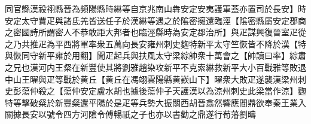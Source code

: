 同官縣漢祋祤縣晉為頻陽縣時綝等自京兆南山犇安定安夷護軍蓋亦置司於長安】時安定太守賈疋與諸氐羌皆送任子於漢綝等遇之於隂密擁還臨涇【隂密縣屬安定郡商之密國詩所謂密人不恭敢距大邦者也臨涇縣時為安定郡治所】與疋謀興復晉室疋從之乃共推疋為平西將軍率衆五萬向長安雍州刺史麴特新平太守竺恢皆不降於漢【特與恢同守新平雍於用翻】聞疋起兵與扶風太守梁綜帥衆十萬會之【帥讀曰率】綜肅之兄也漢河内王粲在新豐使其將劉雅趙染攻新平不克索綝救新平大小百戰雅等敗退中山王曜與疋等戰於黄丘【黄丘在馮翊雲陽縣黄嶔山下】曜衆大敗疋遂襲漢梁州刺史彭蕩仲殺之【蕩仲安定盧水胡也據後蕩仲子天護漢以為涼州刺史此梁當作涼】麴特等擊破粲於新豐粲還平陽於是疋等兵勢大振關西胡晉翕然響應閻鼎欲奉秦王業入關據長安以號令四方河隂令傅暢祇之子也亦以書勸之鼎遂行荀藩劉疇
